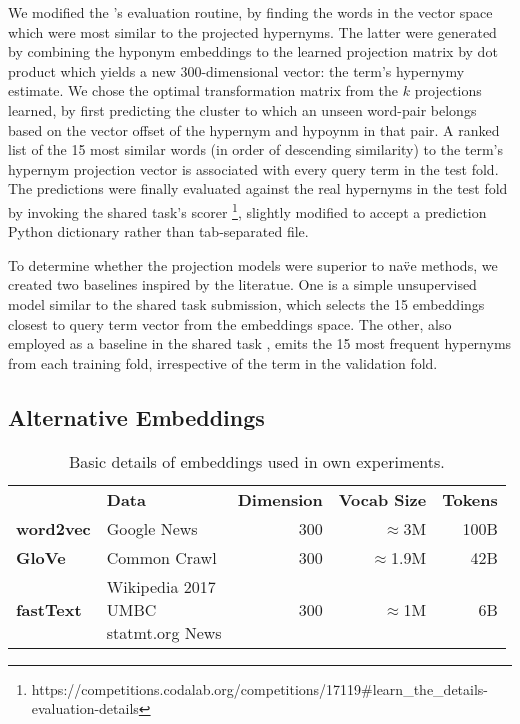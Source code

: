 We modified the \citeauthor{ustalov2017negative}'s evaluation routine, by finding the words in the vector space which were most similar to the projected hypernyms.  The latter were generated by combining the hyponym embeddings to the learned projection matrix by dot product which yields a new 300-dimensional vector: the term's hypernymy estimate.  We chose the optimal transformation matrix from the $k$ projections learned, by first predicting the cluster to which an unseen word-pair belongs based on the vector offset of the hypernym and hypoynm in that pair.  A ranked list of the 15 most similar words (in order of descending similarity) to the term's hypernym projection vector is associated with every query term in the test fold.  The predictions were finally evaluated against the real hypernyms in the test fold by invoking the shared task's scorer \footnote{https://competitions.codalab.org/competitions/17119\#learn\_the\_details-evaluation-details}, slightly modified to accept a prediction Python dictionary rather than tab-separated file.  

To determine whether the projection models were superior to na\"ve methods, we created two baselines inspired by the literatue.  One is a simple unsupervised model similar to the \citep{maldonado2018adapt} shared task submission, which selects the 15 embeddings closest to query term vector from the embeddings space.  The other, also employed as a baseline in the shared task \citep{camacho2018semeval}, emits the 15 most frequent hypernyms from each training fold, irrespective of the term in the validation fold.  

\subsection{Alternative Embeddings}
\begin{table*}\centering
    \begin{tabular}{@{}llrrr@{}} \toprule
    & \textbf{Data} & \textbf{Dimension} & \textbf{Vocab Size} & \textbf{Tokens} \\ \cmidrule{2-5}
    \textbf{word2vec} & Google News & 300 & $\approx$3M & 100B \\ \midrule
    \textbf{GloVe} & Common Crawl & 300 & $\approx$1.9M & 42B \\ \midrule
    \textbf{fastText} & \shortstack[l]{Wikipedia 2017\\UMBC\\statmt.org News} & 300 & $\approx$1M & 6B \\
    \bottomrule
    \end{tabular}
    \caption{Basic details of embeddings used in own experiments.}\label{tab:experiment_embeddings}
\end{table*}

